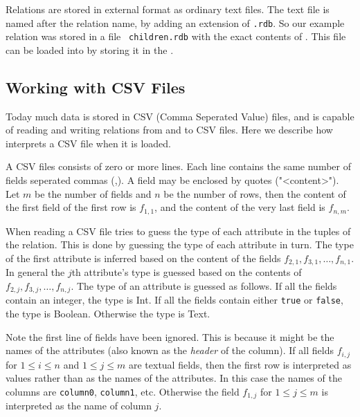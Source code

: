 \documentclass[a4,14pt,latin1]{article}
\begin{document}
Relations are stored in external format as ordinary text files.  The
text file is named after the relation name, by adding an extension of
{\tt .rdb}. So our example relation was stored in a file {\tt
  children.rdb} with the exact contents of .
This file can be loaded into \RAS{} by storing it in the
.

\subsection{Working with CSV Files}
\label{exrelcsvformat}
Today much data is stored in CSV (Comma Seperated Value) files, and
\RAS{} is capable of reading and writing relations from and to CSV
files. Here we describe how \RAS{} interprets a CSV file when it is
loaded.

A CSV files consists of zero or more lines. Each line contains the
same number of fields seperated commas (,). A field may be enclosed by
quotes ("\textless content\textgreater "). Let $m$ be the number of
fields and $n$ be the number of rows, then the content of the first
field of the first row is $f_{1,1}$, and the content of the very last
field is $f_{n,m}$.

When reading a CSV file \RAS{} tries to guess the type of each
attribute in the tuples of the relation. This is done by guessing the
type of each attribute in turn. The type of the first attribute is
inferred based on the content of the fields $f_{2,1}, f_{3,1},\ldots,
f_{n, 1}$. In general the $j$th attribute's type is guessed based on
the contents of $f_{2, j}, f_{3, j},\ldots, f_{n, j}$. The type of an
attribute is guessed as follows. If all the fields contain an integer,
the type is {\sc Int}. If all the fields contain either {\tt true} or
{\tt false}, the type is {\sc Boolean}. Otherwise the type is {\sc Text}.

Note the first line of fields have been ignored. This is because it
might be the names of the attributes (also known as the \emph{header}
of the column). If all fields $f_{i,j}$ for $1 \le i \le n$ and $1 \le
j \le m$ are textual fields, then the first row is interpreted as
values rather than as the names of the attributes. In this case the
names of the columns are {\tt column0}, {\tt column1}, etc. Otherwise
the field $f_{1,j}$ for $1 \le j \le m$ is interpreted as the name of
column $j$.
\end{document}
